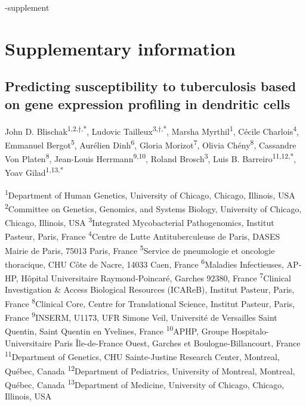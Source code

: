 \documentclass[fleqn,10pt]{wlscirep}
\newcommand{\beginsupplement}{%
 \setcounter{table}{0}
 \renewcommand{\thetable}{S\arabic{table}}%
 \setcounter{figure}{0}
 \renewcommand{\thefigure}{S\arabic{figure}}%
 }
\begin{document}
\begin{filecontents}{\jobname-supplement}
\beginsupplement
\section*{Supplementary information}

\subsection*{Predicting susceptibility to tuberculosis based on gene expression profiling in dendritic cells}


John D.
Blischak\textsuperscript{1}\textsuperscript{,2}\textsuperscript{,$\dag$,*},
Ludovic Tailleux\textsuperscript{3,$\dag$,*}, Marsha
Myrthil\textsuperscript{1}, Cécile Charlois\textsuperscript{4},
Emmanuel Bergot\textsuperscript{5}, Aurélien Dinh\textsuperscript{6},
Gloria Morizot\textsuperscript{7}, Olivia Chény\textsuperscript{8},
Cassandre Von Platen\textsuperscript{8}, Jean-Louis
Herrmann\textsuperscript{9,10}, Roland Brosch\textsuperscript{3}, Luis
B.
Barreiro\textsuperscript{1}\textsuperscript{1}\textsuperscript{,1}\textsuperscript{2}\textsuperscript{,*},
Yoav Gilad\textsuperscript{1,}\textsuperscript{13}\textsuperscript{,*}


\textsuperscript{1}Department of Human Genetics, University of
Chicago, Chicago, Illinois, USA
\textsuperscript{2}Committee on Genetics, Genomics, and Systems
Biology, University of Chicago, Chicago, Illinois, USA
\textsuperscript{3}Integrated Mycobacterial Pathogenomics, Institut
Pasteur, Paris, France
\textsuperscript{4}Centre de Lutte Antituberculeuse de Paris, DASES
Mairie de Paris, 75013 Paris, France
\textsuperscript{5}Service de pneumologie et oncologie thoracique, CHU
Côte de Nacre, 14033 Caen, France
\textsuperscript{6}Maladies Infectieuses, AP-HP, Hôpital Universitaire
Raymond-Poincaré, Garches 92380, France
\textsuperscript{7}Clinical Investigation \& Access Biological
Resources (ICAReB), Institut Pasteur, Paris, France
\textsuperscript{8}Clinical Core, Centre for Translational Science,
Institut Pasteur, Paris, France
\textsuperscript{9}INSERM, U1173, UFR Simone Veil, Université de
Versailles Saint Quentin, Saint Quentin en Yvelines, France
\textsuperscript{10}APHP, Groupe Hospitalo-Universitaire Paris
Île-de-France Ouest, Garches et Boulogne-Billancourt, France
\textsuperscript{11}Department of Genetics, CHU Sainte-Justine
Research Center, Montreal, Québec, Canada
\textsuperscript{12}Department of Pediatrics, University of Montreal,
Montreal, Québec, Canada
\textsuperscript{13}Department of Medicine, University of Chicago,
Chicago, Illinois, USA



\end{filecontents}
\end{document}
